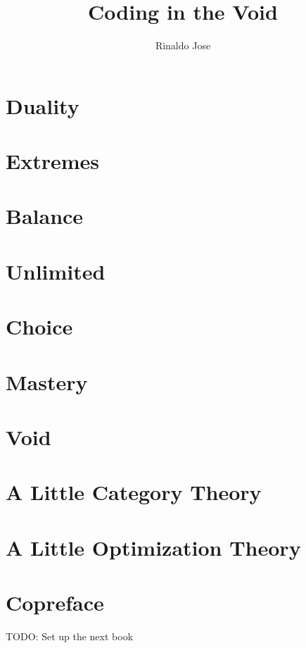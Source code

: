 \documentclass[letterpaper,oneside]{memoir}
\title{Coding in the Void}
\author{Rinaldo Jose}
\begin{document}
\frontmatter

\tableofcontents



\mainmatter


\chapter{Duality}
\chapter{Extremes}
\chapter{Balance}
\chapter{Unlimited}
\chapter{Choice}
\chapter{Mastery}
\chapter{Void}

\appendix
\chapter{A Little Category Theory}
\chapter{A Little Optimization Theory}

\backmatter
\chapter{Copreface}
TODO: Set up the next book
\end{document}
